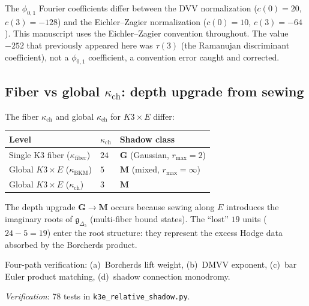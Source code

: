 \documentclass[11pt]{article}
\newcommand{\fg}{\mathfrak{g}}
\begin{document}
\begin{warning}
\label{warn:phi01-convention}
The $\phi_{0,1}$ Fourier coefficients differ between the DVV normalization ($c(0) = 20$, $c(3) = -128$) and the Eichler--Zagier normalization ($c(0) = 10$, $c(3) = -64$). This manuscript uses the Eichler--Zagier convention throughout. The value $-252$ that previously appeared here was $\tau(3)$ (the Ramanujan discriminant coefficient), not a $\phi_{0,1}$ coefficient, a convention error caught and corrected.
\end{warning}

\subsection{Fiber vs global $\kappa_{\mathrm{ch}}$: depth upgrade from sewing}
\label{subsec:k3e-fiber-global}

\begin{proposition}
\label{prop:k3e-kappa-upgrade}
The fiber $\kappa_{\mathrm{ch}}$ and global $\kappa_{\mathrm{ch}}$ for $K3 \times E$ differ:
\begin{center}
\renewcommand{\arraystretch}{1.2}
\begin{tabular}{lll}
 \toprule
 \textbf{Level} & $\kappa_{\mathrm{ch}}$ & \textbf{Shadow class} \\
 \midrule
 Single K3 fiber ($\kappa_{\mathrm{fiber}}$) & $24$ & $\mathbf{G}$ (Gaussian, $r_{\max} = 2$) \\
 Global $K3 \times E$ ($\kappa_{\mathrm{BKM}}$) & $5$ & $\mathbf{M}$ (mixed, $r_{\max} = \infty$) \\
 Global $K3 \times E$ ($\kappa_{\mathrm{ch}}$) & $3$ & $\mathbf{M}$ \\
 \bottomrule
\end{tabular}
\end{center}
The depth upgrade $\mathbf{G} \to \mathbf{M}$ occurs because sewing along $E$ introduces the imaginary roots of $\fg_{\Delta_5}$ (multi-fiber bound states). The ``lost'' $19$ units ($24 - 5 = 19$) enter the root structure: they represent the excess Hodge data absorbed by the Borcherds product.

Four-path verification: (a)~Borcherds lift weight, (b)~DMVV exponent, (c)~bar Euler product matching, (d)~shadow connection monodromy.

\noindent\textit{Verification}: 78 tests in \texttt{k3e\_relative\_shadow.py}.
\end{proposition}
\end{document}
